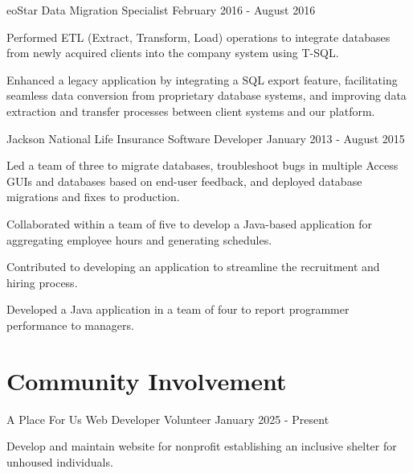 \documentclass{../styles/cv}
\begin{document}
\subsectionpositiondate
    {eoStar}
    {Data Migration Specialist}
    {February 2016 - August 2016}
\resumesublistbegin
    \item Performed ETL (Extract, Transform, Load) operations to integrate databases from newly acquired clients into the company system using T-SQL.
    \item Enhanced a legacy \cpp application by integrating a SQL export feature, facilitating seamless data conversion from proprietary database systems, and improving data extraction and transfer processes between client systems and our platform.
\resumesublistend

\subsectionpositiondate
    {Jackson National Life Insurance}
    {Software Developer}
    {January 2013 - August 2015}
\resumesublistbegin
    \item Led a team of three to migrate databases, troubleshoot bugs in multiple Access GUIs and databases based on end-user feedback, and deployed database migrations and fixes to production.
    \item Collaborated within a team of five to develop a Java-based application for aggregating employee hours and generating schedules.
    \item Contributed to developing an application to streamline the recruitment and hiring process.
    \item Developed a Java application in a team of four to report programmer performance to managers.
\resumesublistend

\section{Community Involvement}

\subsectionpositiondate
    {A Place For Us}
    {Web Developer Volunteer}
    {January 2025 - Present}
\resumesublistbegin
    \item Develop and maintain website for nonprofit establishing an inclusive shelter for unhoused individuals.
\resumesublistend
\end{document}
